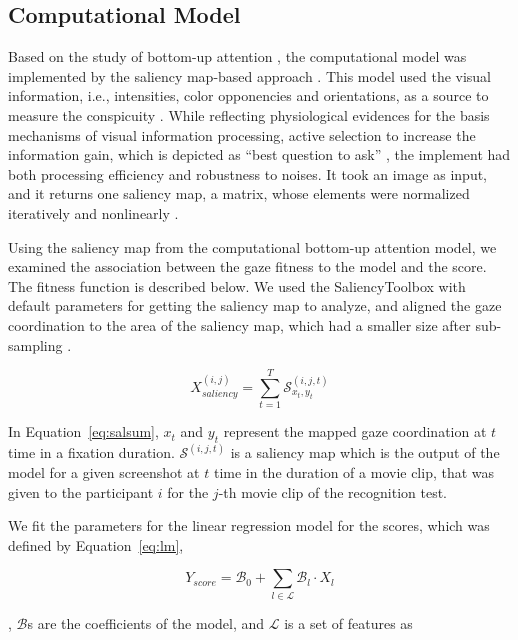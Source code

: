 \documentclass[10pt,letterpaper]{article}
\begin{document}
\subsection{Computational Model}

Based on the study of bottom-up attention \cite{koch1985shifts}, the computational model was implemented by the saliency map-based approach \cite{itti1998model}. This model used the visual information, i.e., intensities, color opponencies and orientations, as a source to measure the conspicuity \cite{Parkhurst2002}. While reflecting physiological evidences for the basis mechanisms of visual information processing, active selection to increase the information gain, which is depicted as ``best question to ask'' \cite{Reinagel1999,zetzsche1998investigation}, the implement had both processing efficiency and robustness to noises. It took an image as input, and it returns one saliency map, a matrix, whose elements were normalized iteratively and nonlinearly \cite{itti2000saliency}.

Using the saliency map from the computational bottom-up attention model, we examined the association between the gaze fitness to the model and the score. The fitness function is described below. We used the SaliencyToolbox with default parameters for getting the saliency map to analyze, and aligned the gaze coordination to the area of the saliency map, which had a smaller size after sub-sampling \cite{Walther2006}.

\begin{equation}\label{eq:salsum}
X_{saliency}^{(i,j)} = \sum_{t=1}^{T} \mathcal{S}_{x_{t},y_{t}}^{(i,j,t)}
\end{equation}

In Equation~\ref{eq:salsum}, $x_{t}$ and $y_{t}$ represent the mapped gaze coordination at $t$ time in a fixation duration. $\mathcal{S}^{(i,j,t)}$ is a saliency map which is the output of the model for a given screenshot at $t$ time in the duration of a movie clip, that was given to the participant $i$ for the $j$-th movie clip of the recognition test.

We fit the parameters for the linear regression model for the scores, which was defined by Equation~\ref{eq:lm},

\begin{equation}\label{eq:lm}
Y_{score} = \mathcal{B}_{0} + \sum_{l \in \mathcal{L}} \mathcal{B}_{l} \cdot X_{l}
\end{equation}

\noindent, $\mathcal{B}$s are the coefficients of the model, and $\mathcal{L}$ is a set of features as  
\end{document}
